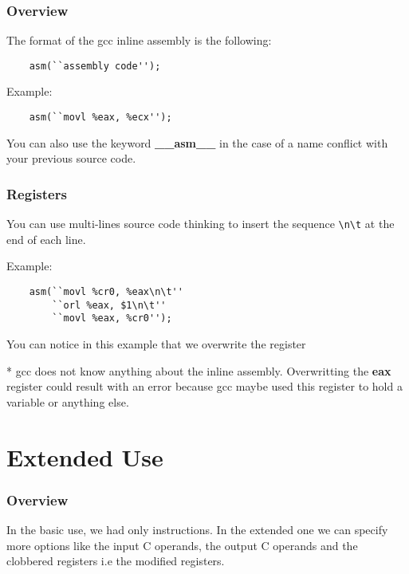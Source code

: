 {%

\begin{frame}[containsverbatim]
  \frametitle{Overview}

  The format of the gcc inline assembly is the following:

  \begin{verbatim}
    asm(``assembly code'');
  \end{verbatim}

  Example:

  \begin{verbatim}
    asm(``movl %eax, %ecx'');
  \end{verbatim}

  You can also use the keyword \textbf{\_\_asm\_\_} in the case of a
  name conflict with your previous source code.
\end{frame}


\begin{frame}[containsverbatim]
  \frametitle{Registers}

  You can use multi-lines source code thinking to insert the sequence
  \verb|\n\t| at the end of each line.

  \nl

  Example:

  \begin{verbatim}
    asm(``movl %cr0, %eax\n\t''
        ``orl %eax, $1\n\t''
        ``movl %eax, %cr0'');
  \end{verbatim}

  You can notice in this example that we overwrite the register %

  \nl

  \alert{*} gcc does not know anything about the inline assembly.
  Overwritting the \textbf{eax} register could result with an error because
  gcc maybe used this register to hold a variable or anything else.
\end{frame}

%
%

\section{Extended Use}


\begin{frame}[containsverbatim]
  \frametitle{Overview}

  In the basic use, we had only instructions. In the extended one
  we can specify more options like the input C operands, the
  output C operands and the clobbered registers i.e the
  modified registers.


\end{frame}}
